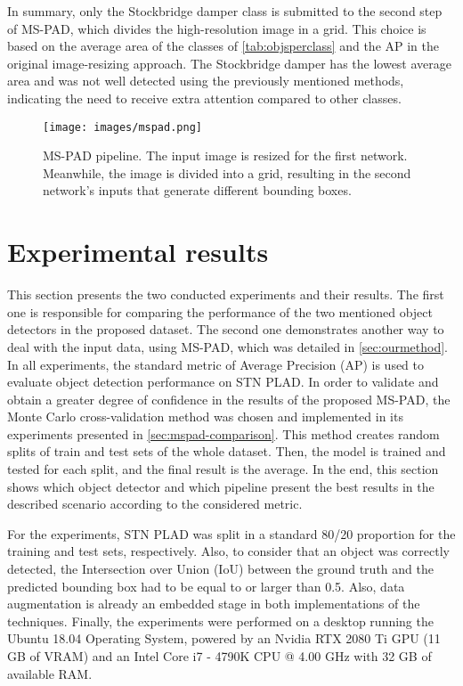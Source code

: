 \documentclass[10pt,conference]{IEEEtran}
\begin{document}
In summary, only the Stockbridge damper class is submitted to the second step of MS-PAD, which divides the high-resolution image in a  grid. This choice is based on the average area of the classes of \autoref{tab:objsperclass} and the AP in the original image-resizing approach. The Stockbridge damper has the lowest average area and was not well detected using the previously mentioned methods, indicating the need to receive extra attention compared to other classes.







\begin{figure}[htp]
    \centering
    \texttt{[image: images/mspad.png]}
    \caption{MS-PAD pipeline. The input image is resized for the first network. Meanwhile, the image is divided into a grid, resulting in the second network's inputs that generate different bounding boxes.}
    \label{fig:method}
\end{figure}







\section{Experimental results}
\label{sec:results}

This section presents the two conducted experiments and their results. The first one is responsible for comparing the performance of the two mentioned object detectors in the proposed dataset. The second one demonstrates another way to deal with the input data, using MS-PAD, which was detailed in \autoref{sec:ourmethod}. In all experiments, the standard metric of Average Precision (AP) is used to evaluate object detection performance on STN PLAD. In order to validate and obtain a greater degree of confidence in the results of the proposed MS-PAD, the Monte Carlo cross-validation method \cite{dubitzky2007fundamentals} was chosen and implemented in its experiments presented in \autoref{sec:mspad-comparison}. This method creates  random splits of train and test sets of the whole dataset. Then, the model is trained and tested for each  split, and the final result is the average. In the end, this section shows which object detector and which pipeline present the best results in the described scenario according to the considered metric.


For the experiments, STN PLAD was split in a standard 80/20 proportion for the training and test sets, respectively. Also, to consider that an object was correctly detected, the Intersection over Union (IoU) between the ground truth and the predicted bounding box had to be equal to or larger than 0.5. Also, data augmentation is already an embedded stage in both implementations of the techniques. Finally, the experiments were performed on a desktop running the Ubuntu 18.04 Operating System, powered by an Nvidia RTX 2080 Ti GPU (11 GB of VRAM) and an Intel Core i7 - 4790K CPU @ 4.00 GHz with 32 GB of available RAM. 
\end{document}
